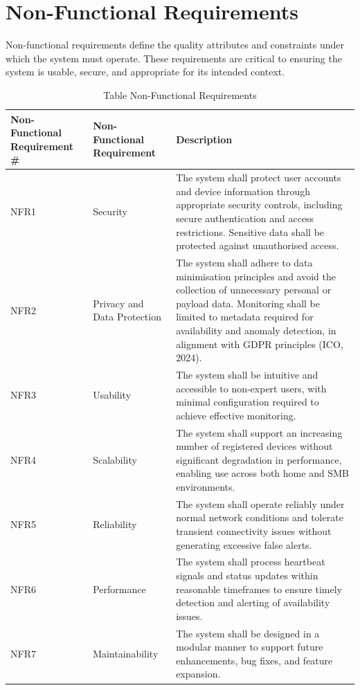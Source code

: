\section{Non-Functional Requirements}

Non-functional requirements define the quality attributes and constraints under which the system must operate. These requirements are critical to ensuring the system is usable, secure, and appropriate for its intended context.

\begin{table}[htbp]
  \centering
  \small
  \caption{Table  Non-Functional Requirements}
  \label{tab:ica1_3}
\begin{tabular}{p{}p{}p{}}
\toprule
Non-Functional Requirement \# & Non-Functional Requirement & Description \\
\midrule
NFR1 & Security & The system shall protect user accounts and device information through appropriate security controls, including secure authentication and access restrictions. Sensitive data shall be protected against unauthorised access. \\
NFR2 & Privacy and Data Protection & The system shall adhere to data minimisation principles and avoid the collection of unnecessary personal or payload data. Monitoring shall be limited to metadata required for availability and anomaly detection, in alignment with GDPR principles (ICO, 2024). \\
NFR3 & Usability & The system shall be intuitive and accessible to non-expert users, with minimal configuration required to achieve effective monitoring. \\
NFR4 & Scalability & The system shall support an increasing number of registered devices without significant degradation in performance, enabling use across both home and SMB environments. \\
NFR5 & Reliability & The system shall operate reliably under normal network conditions and tolerate transient connectivity issues without generating excessive false alerts. \\
NFR6 & Performance & The system shall process heartbeat signals and status updates within reasonable timeframes to ensure timely detection and alerting of availability issues. \\
NFR7 & Maintainability & The system shall be designed in a modular manner to support future enhancements, bug fixes, and feature expansion. \\
\bottomrule
\end{tabular}
\end{table}

